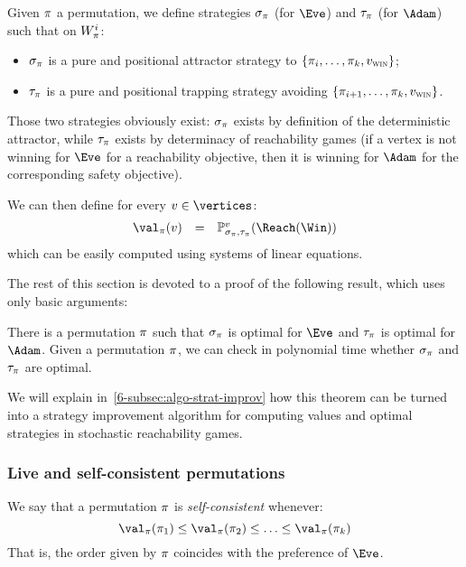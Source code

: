 Given $\pi$ a permutation, we define strategies $\sigma_\pi$ (for
$\Eve$) and $\tau_\pi$ (for $\Adam$) such that on $W_\pi^i$:
\begin{itemize}
\item $\sigma_\pi$ is a pure and positional attractor strategy to
$\{\pi_i,\ldots,\pi_k,v_{\textsc{win}}\}$;
\item $\tau_\pi$ is a pure and positional trapping strategy avoiding
$\{\pi_{i+1},\ldots,\pi_k,v_{\textsc{win}}\}$.
\end{itemize}
Those two strategies obviously exist: $\sigma_\pi$ exists by
definition of the deterministic attractor, while $\tau_\pi$ exists
by determinacy of reachability games (if a vertex is not winning for
$\Eve$ for a reachability objective, then it is winning for $\Adam$ for
the corresponding safety objective).

We can then define for every $v \in \vertices$:
\[
\begin{array}{rcl}
\val_\perm(v) &=& \probm_{\sigma_\perm,\tau_\perm}^v(\Reach(\Win))
\end{array}
\]
which can be easily computed using systems of linear
equations.

The rest of this section is devoted to a proof of the following
result, which uses only basic arguments:

\begin{theorem}
\label{6-thm:corr-strat-improv}
There is a permutation $\pi$ such that $\sigma_\pi$ is optimal
for $\Eve$ and $\tau_\pi$ is optimal for $\Adam$. Given a permutation
$\pi$, we can check in polynomial time whether $\sigma_\pi$ and
$\tau_\pi$ are optimal.
\end{theorem}

We will explain in~\cref{6-subsec:algo-strat-improv} how this
theorem can be turned into a strategy improvement algorithm for
computing values and optimal strategies in stochastic reachability
games.


\subsubsection{Live and self-consistent permutations}


We say that a permutation $\pi$ is \emph{self-consistent} whenever:
\[
\val_\perm(\perm_1) \le \val_\perm(\perm_2) \le \ldots \le \val_\perm(\perm_k)
\]
That is, the order given by $\pi$ coincides with the preference of $\Eve$.

